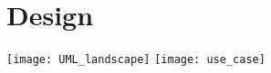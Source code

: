 
\section{Design}
\label{AppendixD}

\texttt{[image: UML\_landscape]}
\newpage
\texttt{[image: use\_case]}






